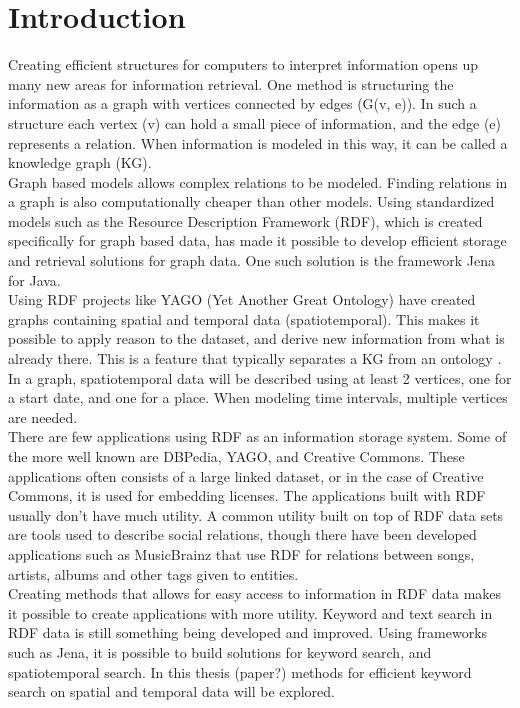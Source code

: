
\chapter{Introduction}
Creating efficient structures for computers to interpret information opens up many new areas for information retrieval. One method is structuring the information as a graph with vertices connected by edges (G(v, e)). In such a structure each vertex (v) can hold a small piece of information, and the edge (e) represents a relation. When information is modeled in this way, it can be called a knowledge graph (KG).\\

Graph based models allows complex relations to be modeled. Finding relations in a graph is also computationally cheaper than other models. Using standardized models such as the Resource Description Framework (RDF), which is created specifically for graph based data, has made it possible to develop efficient storage and retrieval solutions for graph data. One such solution is the framework Jena \cite{jena2} for Java.\\

Using RDF projects like YAGO (Yet Another Great Ontology) \cite{yago} have created graphs containing spatial and temporal data (spatiotemporal). This makes it possible to apply reason to the dataset, and derive new information from what is already there. This is a feature that typically separates a KG from an ontology \cite{KGDefYago}. In a graph, spatiotemporal data will be described using at least 2 vertices, one for a start date, and one for a place. When modeling time intervals, multiple vertices are needed.\\

There are few applications using RDF as an information storage system. Some of the more well known are DBPedia, YAGO, and Creative Commons. These applications often consists of a large linked dataset, or in the case of Creative Commons, it is used for embedding licenses. The applications built with RDF usually don't have much utility. A common utility built on top of RDF data sets are tools used to describe social relations, though there have been developed applications such as MusicBrainz that use RDF for relations between songs, artists, albums and other tags given to entities.\\

Creating methods that allows for easy access to information in RDF data makes it possible to create applications with more utility. Keyword and text search in RDF data is still something being developed and improved. Using frameworks such as Jena, it is possible to build solutions for keyword search, and spatiotemporal search. In this thesis (paper?) methods for efficient keyword search on spatial and temporal data will be explored.\\

